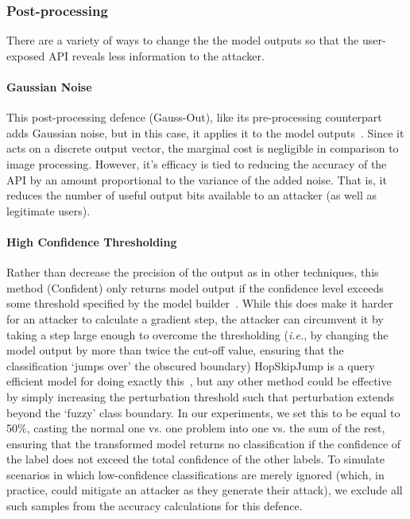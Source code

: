 \documentclass[journal]{IEEEtran}
\begin{document}
\subsubsection{Post-processing}
\label{post-processing}

There are a variety of ways to change the the model outputs so that the user-exposed API reveals less information to the attacker.

\paragraph{Gaussian Noise}
This post-processing defence (Gauss-Out), like its pre-processing counterpart adds Gaussian noise, but in this case, it applies it to the model outputs~\cite{gauss_out}.
Since it acts on a discrete output vector, the marginal cost is negligible in comparison to image processing.
However, it's efficacy is tied to reducing the accuracy of the API by an amount proportional to the variance of the added noise.
That is, it reduces the number of useful output bits available to an attacker (as well as legitimate users).

\paragraph{High Confidence Thresholding}
Rather than decrease the precision of the output as in other techniques, this method (Confident) only returns model output if the confidence level exceeds some threshold specified by the model builder~\cite{high_conf}.
While this does make it harder for an attacker to calculate a gradient step, the attacker can circumvent it by taking a step large enough to overcome the thresholding (\textit{i.e.}, by changing the model output by more than twice the cut-off value, ensuring that the classification `jumps over' the obscured boundary) HopSkipJump is a query efficient model for doing exactly this~\cite{hopskipjump}, but any other method could be effective by simply increasing the perturbation threshold such that perturbation extends beyond the `fuzzy' class boundary.
In our experiments, we set this to be equal to 50\%, casting the normal one vs.
one problem into one vs.
the sum of the rest, ensuring that the transformed model returns no classification if the confidence of the label does not exceed the total confidence of the other labels.
To simulate scenarios in which low-confidence classifications are merely ignored (which, in practice, could mitigate an attacker as they generate their attack), we exclude all such samples from the accuracy calculations for this defence.
\end{document}
